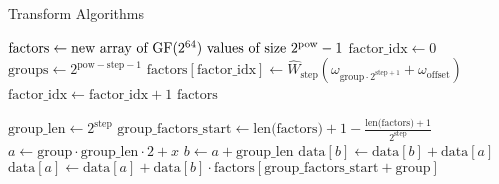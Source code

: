 \begin{algorithm}
    \caption{Transform Algorithms}
    \begin{algorithmic}
            \State $\text{factors} \gets \text{new array of $\text{GF}(2^{64})$ values of size } 2^{\text{pow}} - 1$
            \State $\text{factor\_idx} \gets 0$
                \State $\text{groups} \gets 2^{\text{pow} - \text{step} - 1}$
                    \State $\text{factors}[\text{factor\_idx}] \gets \hat{W}_{\text{step}}(\omega_{\text{group} \cdot 2^{\text{step} + 1}} + \omega_{\text{offset}})$
                    \State $\text{factor\_idx} \gets \text{factor\_idx} + 1$
                \EndFor
            \EndFor
            \State \Return $\text{factors}$
        \EndFunction
    \end{algorithmic}

    \begin{algorithmic}
                \State $\text{group\_len} \gets 2^{\text{step}}$
                \State $\text{group\_factors\_start} \gets \text{len(factors)} + 1 - \frac{\text{len(factors)} + 1}{2^{\text{step}}}$
                        \State $a \gets \text{group} \cdot \text{group\_len} \cdot 2 + x$
                        \State $b \gets a + \text{group\_len}$
                        \State $\text{data}[b] \gets \text{data}[b] + \text{data}[a]$
                        \State $\text{data}[a] \gets \text{data}[a] + \text{data}[b] \cdot \text{factors}[\text{group\_factors\_start} + \text{group}]$
                    \EndFor
                \EndFor
            \EndFor
        \EndFunction
    \end{algorithmic}


\end{algorithm}
